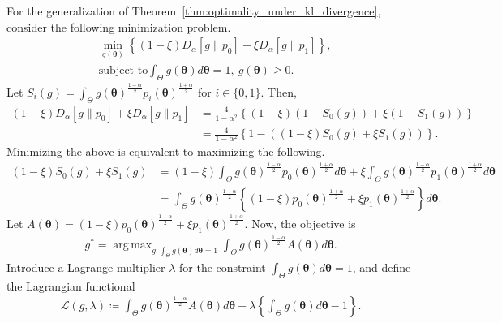 \documentclass[12pt]{article}
\DeclareMathOperator*{\argmax}{arg\,max}
\begin{document}
For the generalization of Theorem~\ref{thm:optimality_under_kl_divergence}, consider the following minimization problem.
\begin{align*}
        & \min_{g(\bm{\theta})}\left\{(1 - \xi) D_\alpha[g \| p_0] + \xi D_\alpha[g \| p_1] \right\}, \\
    & \text{subject to} \int_\Theta g(\bm{\theta}) d\bm{\theta} = 1,\ g(\bm{\theta}) \geq 0.
\end{align*}
Let $S_i(g) = \int_\Theta g(\bm{\theta})^{\frac{1 - \alpha}{2}}p_i(\bm{\theta})^{\frac{1 + \alpha}{2}}$ for $i \in \{0, 1\}$.
Then, 
\begin{align*}
    (1 - \xi) D_\alpha[g \| p_0] + \xi D_\alpha[g \| p_1] &= \frac{4}{1 - \alpha^2}\left\{(1 - \xi)\left(1 - S_0(g)\right) + \xi\left(1 - S_1(g) \right)\right\} \\
    &= \frac{4}{1 - \alpha^2}\left\{1 - \left((1 - \xi)S_0(g) + \xi S_1(g)\right)\right\}.
\end{align*}
Minimizing the above is equivalent to maximizing the following.
\begin{align*}
    (1 - \xi) S_0(g) + \xi S_1(g) &= (1 - \xi) \int_\Theta g(\bm{\theta})^{\frac{1 - \alpha}{2}}p_0(\bm{\theta})^{\frac{1 + \alpha}{2}}d\bm{\theta} + \xi \int_\Theta g(\bm{\theta})^{\frac{1 - \alpha}{2}}p_1(\bm{\theta})^{\frac{1 + \alpha}{2}}d\bm{\theta} \\
    &= \int_\Theta g(\bm{\theta})^{\frac{1 - \alpha}{2}}\left\{(1 - \xi)p_0(\bm{\theta})^{\frac{1 + \alpha}{2}} + \xi p_1(\bm{\theta})^{\frac{1 + \alpha}{2}}\right\}d\bm{\theta}.
\end{align*}
Let $A(\bm{\theta}) = (1 - \xi)p_0(\bm{\theta})^{\frac{1 + \alpha}{2}} + \xi p_1(\bm{\theta})^{\frac{1 + \alpha}{2}}$.
Now, the objective is
\begin{align*}
    g^* = \argmax_{g \colon \int_\Theta g(\bm{\theta})d\bm{\theta} = 1} \int_\Theta g(\bm{\theta})^{\frac{1 - \alpha}{2}} A(\bm{\theta}) d\bm{\theta}.
\end{align*}
Introduce a Lagrange multiplier $\lambda$ for the constraint $\int_\Theta g(\bm{\theta}) d\bm{\theta} = 1$, and define the Lagrangian functional
\begin{align*}
    \mathcal{L}(g, \lambda) \coloneqq \int_\Theta g(\bm{\theta})^{\frac{1 - \alpha}{2}}A(\bm{\theta})d\bm{\theta} - \lambda \left\{\int_\Theta g(\bm{\theta})d\bm{\theta} - 1\right\}.
\end{align*}
\end{document}
